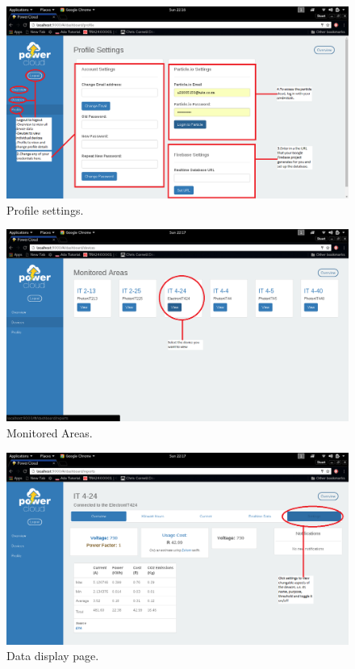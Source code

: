 \documentclass[a4paper,10pt]{article}
\begin{document}
	\begin{figure}[H]
		\includegraphics[width=\textwidth]{images/profile.png}
		\caption{Profile settings. \label{overflow}}
	\end{figure}
	
	\begin{figure}[H]
		\includegraphics[width=\textwidth]{images/view.png}
		\caption{Monitored Areas. \label{overflow}}
	\end{figure}
	
	\begin{figure}[H]
		\includegraphics[width=\textwidth]{images/settings1.png}
		\caption{Data display page. \label{overflow}}
	\end{figure}
	
\end{document}
